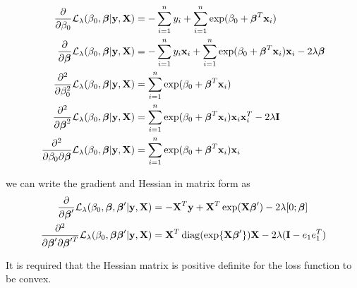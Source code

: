 \documentclass{article}
\newcommand{\vect}[1]{\boldsymbol{#1}}
\newcommand{\vectrm}[1]{\boldsymbol{\rm #1}}
\DeclareMathOperator{\diag}{diag}
\begin{document}
  \begin{align*}
    \frac{\partial}{\partial \beta_0} \mathcal L_\lambda(\beta_0, \vect \beta | \vectrm y, \vectrm X) &= -\sum_{i=1}^{n} y_i + \sum_{i=1}^{n}\exp(\beta_0 + \vect{\beta}^T \vectrm{x}_i) \\
    \frac{\partial}{\partial \vect{\beta}} \mathcal L_\lambda(\beta_0, \vect \beta | \vectrm y, \vectrm X) &= -\sum_{i=1}^{n} y_i \vectrm{x}_i + \sum_{i=1}^{n}\exp(\beta_0 + \vect{\beta}^T \vectrm{x}_i) \vectrm{x}_i - 2\lambda\vect \beta \\
    \frac{\partial^2}{\partial \beta_0^2} \mathcal L_\lambda(\beta_0, \vect \beta | \vectrm y, \vectrm X) &= \sum_{i=1}^{n}\exp(\beta_0 + \vect{\beta}^T \vectrm{x}_i) \\
    \frac{\partial^2}{\partial \vect{\beta}^2} \mathcal L_\lambda(\beta_0, \vect \beta | \vectrm y, \vectrm X) &= \sum_{i=1}^{n}\exp(\beta_0 + \vect{\beta}^T \vectrm{x}_i) \vectrm{x}_i \vectrm{x}_i^T - 2\lambda \vectrm I \\
    \frac{\partial^2}{\partial \beta_0 \partial \vect{\beta}} \mathcal L_\lambda(\beta_0, \vect \beta | \vectrm y, \vectrm X) &= \sum_{i=1}^{n}\exp(\beta_0 + \vect{\beta}^T \vectrm{x}_i) \vectrm{x}_i \\
  \end{align*}

  we can write the gradient and Hessian in matrix form as
  \begin{align*}
    \frac{\partial}{\partial \vect \beta'} \mathcal L_\lambda(\beta_0, \vect \beta, \vect \beta' | \vectrm y, \vectrm X) &= -\vectrm X^T \vectrm y
+ \vectrm X^T \exp(\vectrm X \vect \beta') - 2\lambda [0;\vect \beta] \\
    \frac{\partial^2}{\partial \vect \beta' \partial \vect \beta'^T} \mathcal L_\lambda(\beta_0, \vect \beta \vect \beta'| \vectrm y, \vectrm X) &= \vectrm X^T \diag(\exp \{\vectrm X \vect \beta'\}) \vectrm X - 2\lambda (\vectrm I - e_1e_1^T)
  \end{align*}

  It is required that the Hessian matrix is positive definite for the loss function to be convex.
\end{document}
